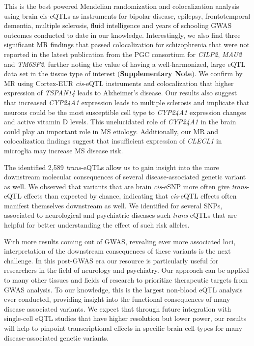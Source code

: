 {This is the best powered Mendelian randomization and colocalization analysis using brain cis-eQTLs as instruments for bipolar disease, epilepsy, frontotemporal dementia, multiple sclerosis, fluid intelligence and years of schooling GWAS outcomes conducted to date in our knowledge. Interestingly, we also find three significant MR findings that passed colocalization for schizophrenia that were not reported in the latest publication from the PGC consortium for \emph{CILP2}, \emph{MAU2} and \emph{TM6SF2}\cite{consortiumMappingGenomicLoci2020}, further noting the value of having a well-harmonized, large eQTL data set in the tissue type of interest (\textbf{Supplementary Note}). We confirm by MR using Cortex-EUR \emph{cis}-eQTL instruments and colocalization that higher expression of \emph{TSPAN14} leads to Alzheimer’s disease. Our results also suggest that increased \emph{CYP24A1} expression leads to multiple sclerosis and implicate that neurons could be the most susceptible cell type to \emph{CYP24A1} expression changes and active vitamin D levels. This unelucidated role of \emph{CYP24A1} in the brain could play an important role in MS etiology. Additionally, our MR and colocalization findings suggest that insufficient expression of \emph{CLECL1} in microglia may increase MS disease risk.

The identified 2,589 \emph{trans}-eQTLs allow us to gain insight into the more downstream molecular consequences of several disease-associated genetic variant as well. We observed that variants that are brain \emph{cis}-eSNP more often give \emph{trans}-eQTL effects than expected by chance, indicating that \emph{cis}-eQTL effects often manifest themselves downstream as well. We identified for several SNPs, associated to neurological and psychiatric diseases such \emph{trans}-eQTLs that are helpful for better understanding the effect of such risk alleles. 

With more results coming out of GWAS, revealing ever more associated loci, interpretation of the downstream consequences of these variants is the next challenge. In this post-GWAS era our resource is particularly useful for researchers in the field of neurology and psychiatry. Our approach can be applied to many other tissues and fields of research to prioritize therapeutic targets from GWAS analysis. To our knowledge, this is the largest non-blood eQTL analysis ever conducted, providing insight into the functional consequences of many disease associated variants. We expect that through future integration with single-cell eQTL studies that have higher resolution but lower power, our results will help to pinpoint transcriptional effects in specific brain cell-types for many disease-associated genetic variants. 

}
